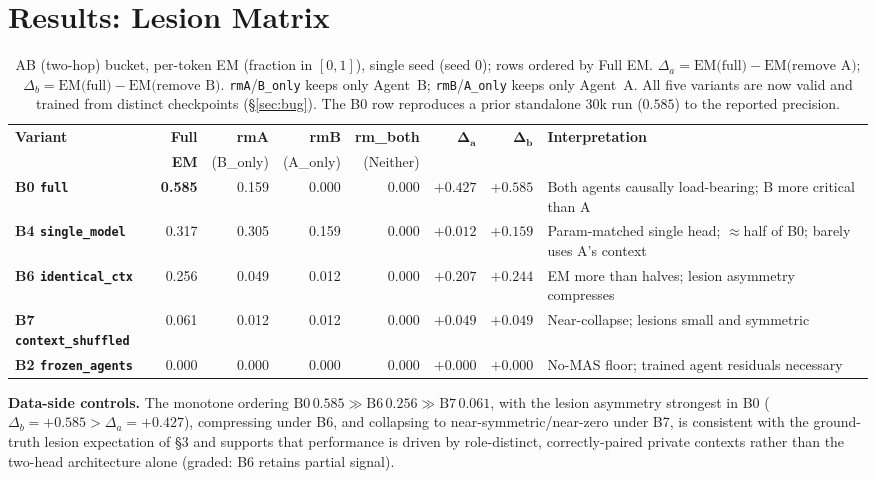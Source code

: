 \documentclass[10pt]{article}
\begin{document}
\section{Results: Lesion Matrix}
\begin{table}[H]
\centering
\footnotesize
\begin{tabular}{@{}l r r r r r r p{3.2cm}@{}}
\toprule
\textbf{Variant} & \textbf{Full} & \textbf{rmA} & \textbf{rmB} & \textbf{rm\_both} &
$\boldsymbol{\Delta_a}$ & $\boldsymbol{\Delta_b}$ & \textbf{Interpretation} \\
 & \textbf{EM} & \footnotesize(B\_only) & \footnotesize(A\_only) & \footnotesize(Neither) & & & \\
\midrule
\textbf{B0 \texttt{full}}            & \textbf{0.585} & 0.159 & 0.000 & 0.000 & $+0.427$ & $+0.585$ & Both agents causally load-bearing; B more critical than A \\
\textbf{B4 \texttt{single\_model}}   & 0.317 & 0.305 & 0.159 & 0.000 & $+0.012$ & $+0.159$ & Param-matched single head; ${\approx}$half of B0; barely uses A's context \\
\textbf{B6 \texttt{identical\_ctx}}  & 0.256 & 0.049 & 0.012 & 0.000 & $+0.207$ & $+0.244$ & EM more than halves; lesion asymmetry compresses \\
\textbf{B7 \texttt{context\_shuffled}} & 0.061 & 0.012 & 0.012 & 0.000 & $+0.049$ & $+0.049$ & Near-collapse; lesions small and symmetric \\
\textbf{B2 \texttt{frozen\_agents}}  & 0.000 & 0.000 & 0.000 & 0.000 & $+0.000$ & $+0.000$ & No-MAS floor; trained agent residuals necessary \\
\bottomrule
\end{tabular}
\caption{AB (two-hop) bucket, per-token EM (fraction in $[0,1]$), single seed (seed 0); rows
ordered by Full EM. $\Delta_a = \text{EM(full)} - \text{EM(remove A)}$;
$\Delta_b = \text{EM(full)} - \text{EM(remove B)}$. \texttt{rmA}/\texttt{B\_only} keeps only
Agent~B; \texttt{rmB}/\texttt{A\_only} keeps only Agent~A. All five variants are now valid and
trained from distinct checkpoints (\S\ref{sec:bug}). The B0 row reproduces a prior standalone
30k run ($0.585$) to the reported precision.}
\end{table}

\noindent\textbf{Data-side controls.} The monotone ordering
$\text{B0}\,0.585 \gg \text{B6}\,0.256 \gg \text{B7}\,0.061$, with the lesion asymmetry
strongest in B0 ($\Delta_b{=}{+}0.585 > \Delta_a{=}{+}0.427$), compressing under B6, and
collapsing to near-symmetric/near-zero under B7, is consistent with the ground-truth lesion
expectation of \S3 and supports that performance is driven by role-distinct, correctly-paired
private contexts rather than the two-head architecture alone (graded: B6 retains partial signal).
\end{document}
